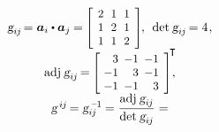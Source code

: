 \begin{otherlanguage}{russian}
\begin{tcolorbox}
\[\begin{array}{c}
\textsl{g}_{i\hspace{-0.1ex}j} \hspace{-0.32ex} = \bm{a}_i \dotp \bm{a}_j \hspace{-0.12ex} = \hspace{-0.16ex}
\scalebox{.92}{$\left[\hspace{-0.16ex}\begin{array}{c@{\hspace{.64em}}c@{\hspace{.64em}}c}
2 & 1 & 1 \\
1 & 2 & 1 \\
1 & 1 & 2
\end{array}\hspace{-0.12ex}\right]$} \hspace{-0.2ex}, \:\:
\determinant \hspace{.12ex} \textsl{g}_{i\hspace{-0.1ex}j} \hspace{-0.25ex} = 4 \hspace{.16ex}, \\
%
\operatorname{adj} \hspace{.12ex} \textsl{g}_{i\hspace{-0.1ex}j} \hspace{-0.25ex} = \hspace{-0.16ex}
\scalebox{.92}{$\left[\hspace{-0.4ex}\begin{array}{r@{\hspace{.5em}}r@{\hspace{.5em}}r}
3 & -1 & -1 \\
-1 & 3 & -1 \\
-1 & -1 & 3
\end{array}\hspace{-0.12ex}\right]^{\hspace{-0.4ex}\scalebox{1.02}{$\T$}}$} \hspace{-0.8ex}, \\
%
\textsl{g}^{\hspace{.32ex}i\hspace{-0.1ex}j} \hspace{-0.25ex} = \textsl{g}_{i\hspace{-0.1ex}j}^{\hspace{.4ex}\expminusone} \hspace{-0.12ex} = \displaystyle \frac{\operatorname{adj} \hspace{.12ex} \textsl{g}_{i\hspace{-0.1ex}j}}{\determinant \hspace{.12ex} \textsl{g}_{i\hspace{-0.1ex}j}} =

\end{array}\]
\end{tcolorbox}
\end{otherlanguage}
